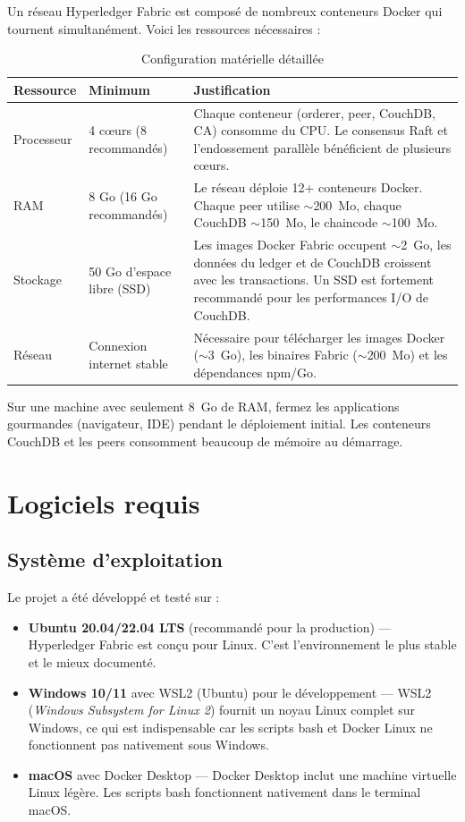 \documentclass[12pt,a4paper,twoside]{report}
\begin{document}
Un réseau Hyperledger Fabric est composé de nombreux conteneurs Docker qui tournent simultanément. Voici les ressources nécessaires :

\begin{table}[H]
\centering
\begin{tabularx}{\textwidth}{lXX}
\toprule
\textbf{Ressource} & \textbf{Minimum} & \textbf{Justification} \\
\midrule
Processeur & 4 cœurs (8 recommandés) & Chaque conteneur (orderer, peer, CouchDB, CA) consomme du CPU. Le consensus Raft et l'endossement parallèle bénéficient de plusieurs cœurs. \\
RAM & 8 Go (16 Go recommandés) & Le réseau déploie 12+ conteneurs Docker. Chaque peer utilise $\sim$200~Mo, chaque CouchDB $\sim$150~Mo, le chaincode $\sim$100~Mo. \\
Stockage & 50 Go d'espace libre (SSD) & Les images Docker Fabric occupent $\sim$2~Go, les données du ledger et de CouchDB croissent avec les transactions. Un SSD est fortement recommandé pour les performances I/O de CouchDB. \\
Réseau & Connexion internet stable & Nécessaire pour télécharger les images Docker ($\sim$3~Go), les binaires Fabric ($\sim$200~Mo) et les dépendances npm/Go. \\
\bottomrule
\end{tabularx}
\caption{Configuration matérielle détaillée}
\end{table}

\begin{warningbox}
Sur une machine avec seulement 8~Go de RAM, fermez les applications gourmandes (navigateur, IDE) pendant le déploiement initial. Les conteneurs CouchDB et les peers consomment beaucoup de mémoire au démarrage.
\end{warningbox}

\section{Logiciels requis}

\subsection{Système d'exploitation}

Le projet a été développé et testé sur :
\begin{itemize}
    \item \textbf{Ubuntu 20.04/22.04 LTS} (recommandé pour la production) --- Hyperledger Fabric est conçu pour Linux. C'est l'environnement le plus stable et le mieux documenté.
    \item \textbf{Windows 10/11} avec WSL2 (Ubuntu) pour le développement --- WSL2 (\textit{Windows Subsystem for Linux 2}) fournit un noyau Linux complet sur Windows, ce qui est indispensable car les scripts bash et Docker Linux ne fonctionnent pas nativement sous Windows.
    \item \textbf{macOS} avec Docker Desktop --- Docker Desktop inclut une machine virtuelle Linux légère. Les scripts bash fonctionnent nativement dans le terminal macOS.
\end{itemize}
\end{document}
